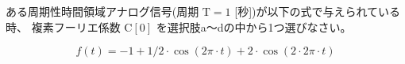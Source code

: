 ある周期性時間領域アナログ信号(周期 $\textrm{T} = 1$ [秒])が以下の式で与えられている時、
複素フーリエ係数 $\textrm{C}[0]$ を選択肢a〜dの中から1つ選びなさい。

\[
f(t) = 
-1
+ 1/2 \cdot \cos( 2\pi \cdot t )
+ 2 \cdot \cos( 2 \cdot 2 \pi \cdot t )
\]
